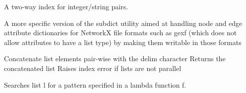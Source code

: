 \documentclass[letterpaper,10pt,english]{sphinxmanual}
\begin{document}
\begin{fulllineitems}
\label{tethne.utilities:tethne.utilities.Dictionary}
A two-way index for integer/string pairs.

\end{fulllineitems}


\begin{fulllineitems}
\label{tethne.utilities:tethne.utilities.attribs_to_string}
A more specific version of the subdict utility aimed at handling
node and edge attribute dictionaries for NetworkX file formats such as
gexf (which does not allow attributes to have a list type) by making
them writable in those formats

\end{fulllineitems}


\begin{fulllineitems}
\label{tethne.utilities:tethne.utilities.concat_list}
Concatenate list elements pair-wise with the delim character
Returns the concatenated list
Raises index error if lists are not parallel

\end{fulllineitems}


\begin{fulllineitems}
\label{tethne.utilities:tethne.utilities.contains}
Searches list l for a pattern specified in a lambda function f.

\end{fulllineitems}

\end{document}

